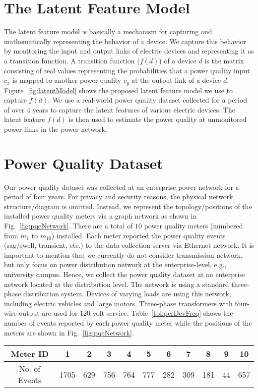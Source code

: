 \section{The Latent Feature Model}
The latent feature model is basically a mechanism for capturing and mathematically representing the behavior of a device. We capture this behavior by monitoring the input and output links of electric devices and representing it as a transition function. A transition function ($f(d)$) of a device $d$ is the matrix consisting of real values representing the probabilities that a power quality input $c_x$ is mapped to another power quality $c_y$ at the output link of a device $d$. Figure~\ref{fig:latentModel} shows the proposed latent feature model we use to capture $f(d)$. We use a real-world power quality dataset collected for a period of over 4 years to capture the latent features of various electric devices. The latent feature $f(d)$ is then used to estimate the power quality at unmonitored power links in the power network.

\section{Power Quality Dataset}
Our power quality dataset was collected at an enterprise power network for a period of four years. For privacy and security reasons, the physical network structure/diagram is omitted. Instead, we represent the topology/positions of the installed power quality meters via a graph network as shown in Fig.~\ref{fig:pqeNetwork}. There are a total of $10$ power quality meters (numbered from $m_1$ to $m_{10}$) installed. Each meter reported the power quality events (sag/swell, transient, etc.) to the data collection server via Ethernet network. It is important to mention that we currently do not consider transmission network, but only focus on power distribution network at the enterprise-level, e.g., university campus. Hence, we collect the power quality dataset at an enterprise network located at the distribution level. The network is using a standard three-phase distribution system. Devices of varying loads are using this network, including electric vehicles and large motors. Three-phase transformers with four-wire output are used for $120$ volt service. Table~\ref{tbl:perDevFreq} shows the number of events reported by each power quality meter while the positions of the meters are shown in Fig.~\ref{fig:pqeNetwork}.

\begin{table*}[!t]
\caption{Frequency table showing the number of events generated/reported by each power quality meter.}
\centering 
\renewcommand{\tabcolsep}{0.15cm}
\begin{tabular}{|c|c|c|c|c|c|c|c|c|c|c|}
\hline Meter ID & 1 & 2 & 3 & 4 & 5 & 6 & 7 & 8 & 9 & 10\tabularnewline
\hline No. of Events & 1705 & 629 & 756 & 764 & 777 & 282 & 309 & 181 & 44 & 657\tabularnewline
\hline 
\end{tabular}
\label{tbl:perDevFreq}
\end{table*}


